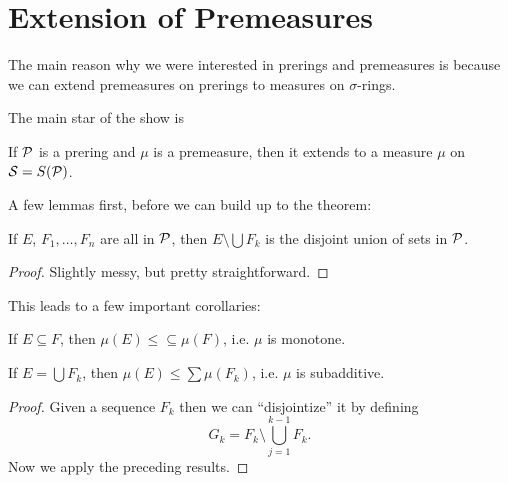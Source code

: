 \section{Extension of Premeasures}

The main reason why we were interested in prerings and premeasures is because we can extend premeasures on prerings to measures on $\sigma$-rings.

The main star of the show is

\begin{theorem}
    If $\mathcal P$ is a prering and $\mu$ is a premeasure, then it extends to a measure $\mu$ on $\mathcal S = S(\mathcal P)$.
\end{theorem}

A few lemmas first, before we can build up to the theorem:

\begin{lemma}
    If $E$, $F_1, \dots, F_n$ are all in $\mathcal P$, then $E \setminus \bigcup F_k$ is the disjoint union of sets in $\mathcal P$.
\end{lemma}

\begin{proof}
    Slightly messy, but pretty straightforward.
\end{proof}

This leads to a few important corollaries:

\begin{corollary}
    If $E \subseteq F$, then $\mu(E) \le \subseteq \mu(F)$, i.e. $\mu$ is monotone.
\end{corollary}

\begin{corollary}
    If $E = \bigcup F_k$, then $\mu(E) \le \sum \mu(F_k)$, i.e. $\mu$ is subadditive.
\end{corollary}

\begin{proof}
    Given a sequence $F_k$ then we can ``disjointize'' it by defining \[G_k = F_k \setminus \bigcup_{j = 1}^{k - 1}F_k.\] Now we apply the preceding results.
\end{proof}

 